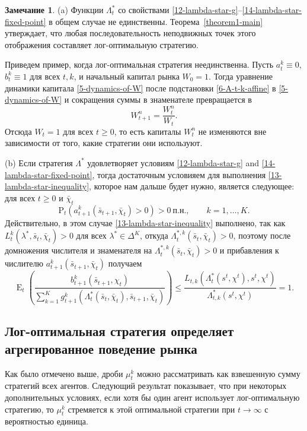 \documentclass[a4paper,12pt,russian]{article} %
\theoremstyle{definition}
\newtheorem{remark}{Замечание}
\DeclareMathOperator{\E}{E}
\renewcommand{\P}{\mathrm{P}}
\begin{document}
\begin{remark}
(a) Функции $\Lambda^*_t$ со свойствами \eqref{12-lambda-star-g}--\eqref{14-lambda-star-fixed-point} в общем случае не единственны.
Теорема~\ref{theorem1-main} утверждает, что любая последовательность неподвижных точек этого отображения составляет лог-оптимальную стратегию. 

Приведем пример, когда лог-оптимальная стратегия неединственна.
Пусть $a_{t}^k \equiv 0$, $b_{t}^k\equiv 1$ для всех $t,k$, и начальный капитал рынка $W_0=1$.
Тогда уравнение динамики капитала \eqref{5-dynamics-of-W} после подстановки \eqref{6-A-t-k-affine} в \eqref{5-dynamics-of-W} и сокращения суммы в знаменателе превращается в 
\[
W_{t+1}^n = \frac{W_t^n}{W_t}.
\]
Отсюда $W_t=1$ для всех $t\ge 0$, то есть капиталы $W_t^n$ не изменяются вне зависимости от того, какие стратегии они используют.

(b) Если стратегия $\Lambda^*$ удовлетворяет условиям \eqref{12-lambda-star-g} and \eqref{14-lambda-star-fixed-point}, тогда достаточным условияем для выполнения \eqref{13-lambda-star-inequality}, которое нам дальше будет нужно, является следующее: для всех $t\ge0$ и $\bar\chi_t$
\[
\P_t(a_{t+1}^k(\bar s_{t+1},\bar\chi_t) > 0) > 0\ \text{п.н.}, \qquad k=1,\dots,K.
\]
Действительно, в этом случае \eqref{13-lambda-star-inequality} выполнено, так как $L_{t}^k (\lambda^*,\bar s_t,\bar \chi_t)>0$ для всех $\lambda^* \in\Delta^K$, откуда $\Lambda_{t}^{*,k}(\bar s_t,\bar\chi_t)>0$, поэтому после домножения числителя и знаменателя на $\Lambda_{t}^{*,k}(\bar s_t,\bar\chi_t)>0$ и прибавления к числителю ${a_{t+1}^k(\bar s_{t+1},\bar\chi_t)}$ получаем
\[
\E_t \left(
  \frac{b_{t+1}^k(\bar s_{t+1},\chi_t)}
       {\sum_{k=1}^K g_{t+1}^k(\Lambda_t^*(\bar s_t,\bar\chi_t),\bar s_{t+1},\bar\chi_t)}
\right)
\le \frac{L_{t,k}(\Lambda_{t}^*(s^t,\chi^t), s^t, \chi^t)}
         {\Lambda^*_{t,k}(s^t,\chi^t)}
= 1.
\]
\end{remark}




\subsection{Лог-оптимальная стратегия определяет агрегированное поведение рынка}
\label{section-3-3-aggregate-market-behaviour}
Как было отмечено выше, дроби $\mu_{t}^k$ можно рассматривать как взвешенную сумму стратегий всех агентов.
Следующий результат показывает, что при некоторых дополнительных условиях, если хотя бы один агент использует лог-оптимальную стратегию, то $\mu_{t}^k$ стремяется к этой оптимальной стратегии при $t\to\infty$ с вероятностью единица.
\end{document}
